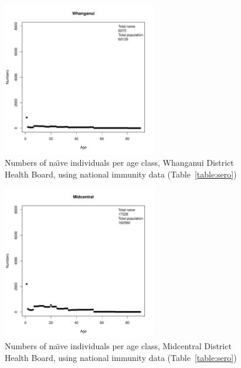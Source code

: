 \documentclass{article}
\begin{document}
\begin{figure}[H]
     \begin{center}
     \includegraphics[width=0.6\textwidth]{dhb11.pdf}
     \end{center}
     \caption{Numbers of na\"{\i}ve individuals per age class, Whanganui District Health Board, using national immunity data (Table~\autoref{table:sero})}
     \label{fig:Whanganui}
\end{figure}

\begin{figure}[H]
     \begin{center}
     \includegraphics[width=0.6\textwidth]{dhb12.pdf}
     \end{center}
     \caption{Numbers of na\"{\i}ve individuals per age class, Midcentral District Health Board, using national immunity data (Table~\autoref{table:sero})}
     \label{fig:Midcentral}
\end{figure}
\end{document}
